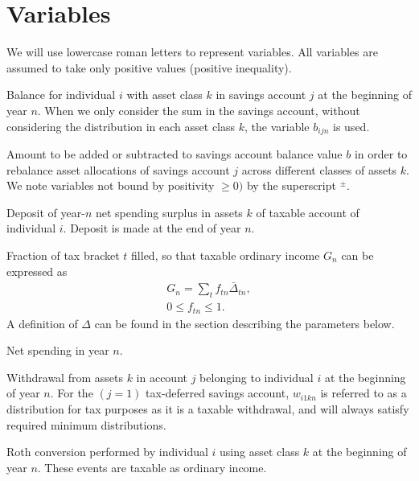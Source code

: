 \documentclass{report}[fleqn,12pt]
\begin{document}
\section{Variables}
We will use lowercase roman letters to represent variables. All variables are assumed
to take only positive values (positive inequality).
\begin{description}[leftmargin=4em,style=multiline]
\item [$b_{ijkn}$]
	Balance for individual $i$ with asset class $k$ in savings account $j$ at the beginning of year $n$.
	When we only consider the sum in the savings account, without considering the distribution
	in each asset class $k$, the variable $b_{ijn}$ is used.
\item [$b^\pm_{ijkn}$]
	Amount to be added or subtracted to savings account balance value $b$ in order
	to rebalance asset allocations of
	savings account $j$ across different classes of assets $k$. We note
		variables not bound by positivity $\ge 0)$ by the superscript $^\pm$.
\item [$d_{ikn}$]
	Deposit of year-$n$ net spending surplus in assets $k$ of taxable account of individual $i$.
	Deposit is made at the end of year $n$.
\item [$f_{t n}$]
	Fraction of tax bracket $t$ filled, so that taxable ordinary income $G_n$ can be expressed as
	\begin{eqnarray}
		\label{Eq:Tx1}
		G_n = \sum_t f_{t n}\bar{\Delta}_{t n},\\
		0 \leq f_{t n} \leq 1.
	\end{eqnarray}
	A definition of $\Delta$ can be found in the section describing the parameters below. 
\item [$g_n$]
	Net spending in year $n$.
\item [$w_{ijkn}$]
	Withdrawal from assets $k$ in account $j$ belonging to individual $i$ at the beginning of year $n$.
	For the $(j=1)$ tax-deferred savings account, $w_{i1kn}$ is referred to as a distribution for
	tax purposes as it is a taxable withdrawal, and will always satisfy required minimum distributions.
\item [$x_{ikn}$]
	Roth conversion performed by individual $i$ using asset class $k$ at the beginning of year $n$.
	These events are taxable as ordinary income.
\end{description}
\end{document}
